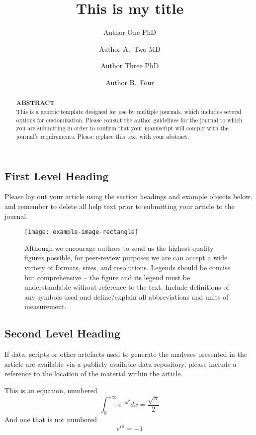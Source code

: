 \documentclass[alpha-refs,serif]{ecotropicos-article}
\title{This is my title}
\author[1\authfn{1}]{Author One PhD 
	\href{http://orcid.org/0000-0000-0000-0000}		
    {\textcolor{orcidlogocol}{\aiOrcid}}}
\author[2\authfn{1}]{Author A.~Two MD}
\author[2\authfn{2}]{Author Three PhD}
\author[2]{Author B.~Four}
\affil[1]{Department, Institution, City, State or Province, Postal Code, Country}
\affil[2]{Department, Institution, City, State or Province, Postal Code, Country}
\begin{document}
\maketitle

\begin{abstract}
\begingroup  
 \textbf{ABSTRACT}\\[0.35em]
\endgroup
This is a generic template designed for use by multiple journals, which includes several options for customization. Please consult the author guidelines for the journal to which you are submitting in order to confirm that your manuscript will comply with the journal's requirements. Please replace this text with your abstract.

\end{abstract}

\begin{multicols}{2}
\section*{First Level Heading}
Please lay out your article using the section headings and example objects below, and remember to delete all help text prior to submitting your article to the journal.
\end{multicols}


\begin{figure}[bt]
\centering
\texttt{[image: example-image-rectangle]}
\caption{Although we encourage authors to send us the highest-quality figures possible, for peer-review purposes we are can accept a wide variety of formats, sizes, and resolutions. Legends should be concise but comprehensive – the figure and its legend must be understandable without reference to the text. Include definitions of any symbols used and define/explain all abbreviations and units of measurement.}
\end{figure}


\begin{multicols}{2}
\subsection*{Second Level Heading}
If data, scripts or other artefacts used to generate the analyses presented in the article are available via a publicly available data repository, please include a reference to the location of the material within the article.

This is an equation, numbered
\begin{equation}
\int_0^{+\infty}e^{-x^2}dx=\frac{\sqrt{\pi}}{2}
\end{equation}
And one that is not numbered
\begin{equation*}
e^{i\pi}=-1
\end{equation*}

\end{multicols}
\end{document}
